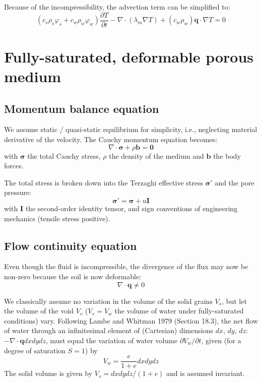 \documentclass[letterpaper,12pt,oneside]{report}
\begin{document}
Because of the incompressibility, the advection term can be simplified to:
\begin{equation}
(c_s \rho_s \varphi_s + c_w \rho_w \varphi_w) \frac{\partial T}{\partial t} - \nabla \cdot (\lambda_m \nabla T) + (c_w \rho_w) \bm{q} \cdot \nabla T = 0
\end{equation}













\section{Fully-saturated, deformable porous medium}

\subsection{Momentum balance equation}

We assume static / quasi-static equilibrium for simplicity, i.e., neglecting material derivative of the velocity. The Cauchy momentum equation becomes:
\begin{equation}
\nabla \cdot \bm{\sigma} + \rho \bm{b} = \bm{0}
\end{equation}
with $\bm{\sigma}$ the total Cauchy stress, $\rho$ the density of the medium and $\bm{b}$ the body forces.

The total stress is broken down into the Terzaghi effective stress $\bm{\sigma}'$ and the pore pressure:
\begin{equation}
\bm{\sigma}' = \bm{\sigma} + u \bm{I}
\end{equation}
with $\bm{I}$ the second-order identity tensor, and sign conventions of engineering mechanics (tensile stress positive).

\subsection{Flow continuity equation}

Even though the fluid is incompressible, the divergence of the flux may now be non-zero because the soil is now deformable:
\begin{equation}
\nabla \cdot \bm{q} \neq 0
\end{equation}

We classically assume no variation in the volume of the solid grains $V_s$, but let the volume of the void $V_v$ ($V_v=V_w$ the volume of water under fully-saturated conditions) vary. Following Lambe and Whitman 1979 (Section 18.3), the net flow of water through an infinitesimal element of (Cartesian) dimensions $dx$, $dy$, $dz$: $-\nabla \cdot \bm{q} dx dy dz$, must equal the variation of water volume $\partial V_w / \partial t$, given (for a degree of saturation $S=1$) by
\begin{equation}
V_w = \frac{e}{1+e} dx dy dz
\end{equation}
The solid volume is given by $V_s = dxdydz/(1+e)$ and is assumed invariant.
\end{document}
